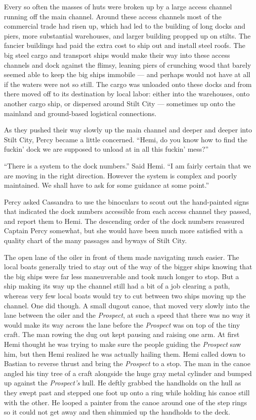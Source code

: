 \documentclass[]{scrbook}
\begin{document}
Every so often the masses of huts were broken up by a large access
channel running off the main channel. Around these access channels most
of the commercial trade had risen up, which had led to the building of
long docks and piers, more substantial warehouses, and larger building
propped up on stilts. The fancier buildings had paid the extra cost to
ship out and install steel roofs. The big steel cargo and transport
ships would make their way into these access channels and dock against
the flimsy, leaning piers of crunching wood that barely seemed able to
keep the big ships immobile --- and perhaps would not have at all if the
waters were not so still. The cargo was unloaded onto these docks and
from there moved off to its destination by local labor: either into the
warehouses, onto another cargo ship, or dispersed around Stilt City ---
sometimes up onto the mainland and ground-based logistical connections.

As they pushed their way slowly up the main channel and deeper and
deeper into Stilt City, Percy became a little concerned. ``Hemi, do you
know how to find the fuckin' dock we are supposed to unload at in all
this fuckin' mess?''

``There is a system to the dock numbers.'' Said Hemi. ``I am fairly
certain that we are moving in the right direction. However the system is
complex and poorly maintained. We shall have to ask for some guidance at
some point.''

Percy asked Cassandra to use the binoculars to scout out the
hand-painted signs that indicated the dock numbers accessible from each
access channel they passed, and report them to Hemi. The descending
order of the dock numbers reassured Captain Percy somewhat, but she
would have been much more satisfied with a quality chart of the many
passages and byways of Stilt City.

The open lane of the oiler in front of them made navigating much easier.
The local boats generally tried to stay out of the way of the bigger
ships knowing that the big ships were far less maneuverable and took
much longer to stop. But a ship making its way up the channel still had
a bit of a job clearing a path, whereas very few local boats would try
to cut between two ships moving up the channel. One did though. A small
dugout canoe, that moved very slowly into the lane between the oiler and
the \emph{Prospect}, at such a speed that there was no way it would make
its way across the lane before the \emph{Prospect} was on top of the
tiny craft. The man rowing the dug out kept pausing and raising one arm.
At first Hemi thought he was trying to make sure the people guiding the
\emph{Prospect} saw him, but then Hemi realized he was actually hailing
them. Hemi called down to Bastian to reverse thrust and bring the
\emph{Prospect} to a stop. The man in the canoe angled his tiny tree of
a craft alongside the huge gray metal cylinder and bumped up against the
\emph{Prospect's} hull. He deftly grabbed the handholds on the hull as
they swept past and stepped one foot up onto a ring while holding his
canoe still with the other. He looped a painter from the canoe around
one of the step rings so it could not get away and then shimmied up the
handholds to the deck.
\end{document}
